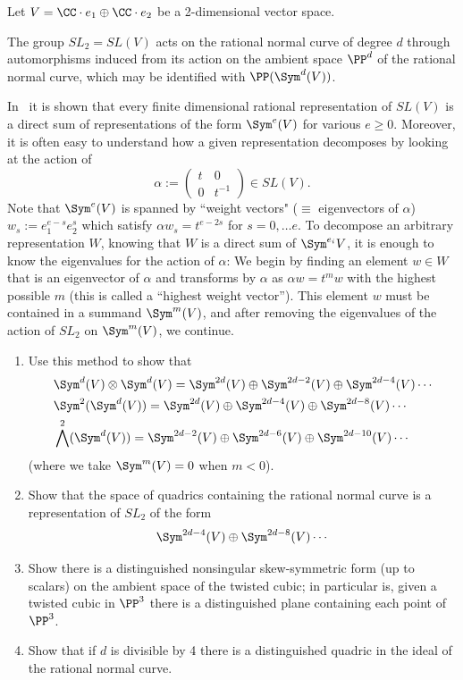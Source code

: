 \begin{exercise}\label{rnc and representations}
Let $V = \CC\cdot e_1\oplus \CC\cdot e_2$ be a 2-dimensional vector space. 

The group $SL_2= SL(V)$ acts on the rational normal curve of degree $d$ through automorphisms induced from its action on
the ambient space $\PP^d$ of the rational normal curve, which may be identified with $\PP(\Sym^d(V))$.

In~\cite[pp. 146--150]{Fulton-Harris} it is shown that
 every finite dimensional rational 
representation of $SL(V)$ is a direct sum of representations of the form $\Sym^e(V)$ for various $e\geq 0$. Moreover, it is often easy to understand
how a given representation decomposes by looking at the action of
$$
\alpha := \begin{pmatrix}
t&0\\
0&t^{-1}
\end{pmatrix}
\in SL(V).
$$
Note that $\Sym^e(V)$ is spanned by ``weight vectors" ($\equiv$ eigenvectors of $\alpha$) $w_s := e_1^{e-s} e_2^{s}$ 
which satisfy $\alpha w_s = t^{e-2s}$ for $s = 0, \dots e$.
To decompose an arbitrary representation $W$, knowing that $W$ is a direct sum of $\Sym^{e_i}V$, it is enough to know the 
eigenvalues for the action of $\alpha$: We begin by finding an element $w\in W$ that
is an eigenvector of $\alpha$ and transforms by $\alpha$ as $\alpha w = t^mw$ with the highest possible $m$ (this is called a ``highest weight vector''). This element $w$ must be contained
in a summand $\Sym^m(V)$, and after removing the eigenvalues of the action of $SL_2$ on $\Sym^m(V)$, we continue. 
\begin{enumerate}
 \item Use this method to show that 
\begin{align*}
&\Sym^d(V)\otimes \Sym^d(V)= \Sym^{2d}(V) \oplus  \Sym^{2d-2}(V) \oplus \Sym^{2d-4}(V) \cdots\\
 &\Sym^2(\Sym^d(V))= \Sym^{2d}(V) \oplus \Sym^{2d-4}(V)\oplus \Sym^{2d-8}(V) \cdots\\
 &\bigwedge^2(\Sym^d(V))= \Sym^{2d-2}(V) \oplus \Sym^{2d-6}(V)\oplus \Sym^{2d-10}(V) \cdots
\end{align*}
  (where we take $\Sym^{m}(V)=0$ when $m<0$).
 \item Show that the space of quadrics containing the rational normal curve is a representation of $SL_2$ of the form
 $$
 \Sym^{2d-4}(V)\oplus \Sym^{2d-8}(V) \cdots
 $$
  \item Show  there is a distinguished nonsingular skew-symmetric form (up to scalars) on the ambient space of the twisted cubic; in particular
  is, given a twisted cubic in $\PP^3$ there is a distinguished plane containing each point of $\PP^3$.
 \item Show that if $d$ is divisible by 4 there is a distinguished quadric in the ideal of the rational normal curve.
\end{enumerate}
\end{exercise}

